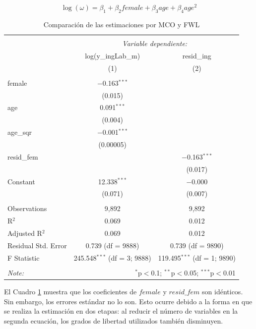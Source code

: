 \documentclass[12pt,a4paper,onecolumn]{article}
\begin{document}
\begin{equation}
\log(\omega) = \beta_1 + \beta_2 female + \beta_3 age + \beta_4 age^2
\label{eq_age}
\end{equation}
\begin{table}[!htbp] 
\centering 
\caption{Comparación de las estimaciones por MCO y FWL} 
\label{cuadro_FWL} 
\scriptsize   %
\begin{tabular}{@{\extracolsep{5pt}}lcc} 
\\[-1.8ex]\hline 
\hline \\[-1.8ex] 
 & \multicolumn{2}{c}{\textit{Variable dependiente:}} \\ 
\cline{2-3} 
 & log(y\_ingLab\_m) & resid\_ing \\ 
 & (1) & (2)\\ 
\hline \\[-1.8ex] 
 female & $-$0.163$^{***}$ &  \\ 
  & (0.015) &  \\ 
 age & 0.091$^{***}$ &  \\ 
  & (0.004) &  \\ 
 age\_sqr & $-$0.001$^{***}$ &  \\ 
  & (0.00005) &  \\ 
 resid\_fem &  & $-$0.163$^{***}$ \\ 
  &  & (0.017) \\ 
 Constant & 12.338$^{***}$ & $-$0.000 \\ 
  & (0.071) & (0.007) \\ 
\hline \\[-1.8ex] 
Observations & 9,892 & 9,892 \\ 
R$^{2}$ & 0.069 & 0.012 \\ 
Adjusted R$^{2}$ & 0.069 & 0.012 \\ 
Residual Std. Error & 0.739 (df = 9888) & 0.739 (df = 9890) \\ 
F Statistic & 245.548$^{***}$ (df = 3; 9888) & 119.495$^{***}$ (df = 1; 9890) \\ 
\hline 
\hline \\[-1.8ex] 
\textit{Note:}  & \multicolumn{2}{r}{$^{*}$p$<$0.1; $^{**}$p$<$0.05; $^{***}$p$<$0.01} \\ 
\end{tabular} 
\end{table}

El Cuadro \ref{cuadro_FWL} muestra que los coeficientes de $female$ y $resid\_fem$ son idénticos. 
Sin embargo, los errores estándar no lo son. 
Esto ocurre debido a la forma en que se realiza la estimación en dos etapas: al reducir el número de variables en la segunda ecuación, los grados de libertad utilizados también disminuyen. 
\end{document}

